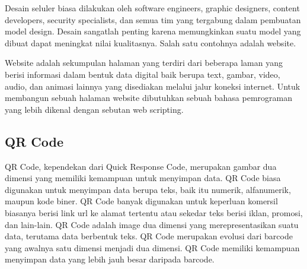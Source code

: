 Desain seluler biasa dilakukan oleh software engineers, graphic designers, content developers, security specialists, dan semua tim yang tergabung dalam pembuatan model design. Desain sangatlah penting karena memungkinkan suatu model yang dibuat dapat meningkat nilai kualitasnya. Salah satu contohnya adalah website. 

Website adalah sekumpulan halaman yang terdiri dari beberapa laman yang berisi informasi dalam bentuk data digital baik berupa text, gambar, video, audio, dan animasi lainnya yang disediakan melalui jalur koneksi internet. Untuk membangun sebuah halaman website dibutuhkan sebuah bahasa pemrograman yang lebih dikenal dengan sebutan web scripting. 


\subsection{QR Code}
QR Code, kependekan dari Quick Response Code, merupakan gambar dua dimensi yang memiliki kemampuan untuk menyimpan data. QR Code biasa digunakan untuk menyimpan data berupa teks, baik itu numerik, alfanumerik, maupun kode biner. QR Code banyak digunakan untuk keperluan komersil biasanya berisi link url ke alamat tertentu atau sekedar teks berisi iklan, promosi, dan lain-lain. QR Code adalah image dua dimensi yang merepresentasikan
suatu data, terutama data berbentuk teks. QR Code merupakan evolusi dari barcode yang awalnya satu dimensi menjadi dua dimensi. QR Code memiliki kemampuan menyimpan data yang
lebih jauh besar daripada barcode.